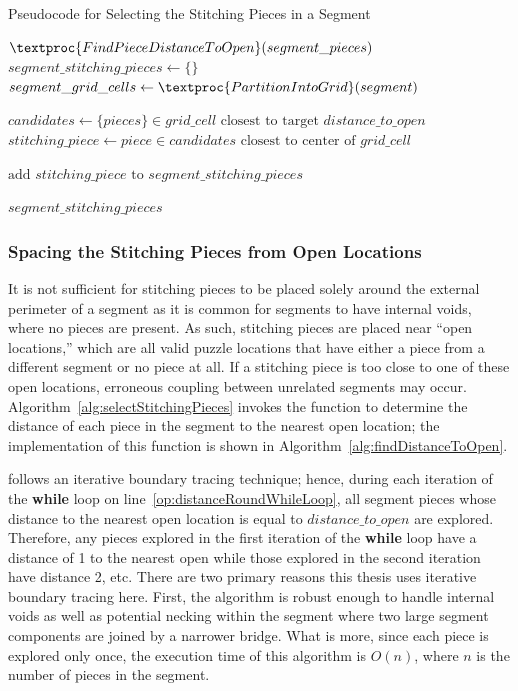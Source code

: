 \begin{algorithm}[tb]
\caption{Pseudocode for Selecting the Stitching Pieces in a Segment}
\label{alg:selectStitchingPieces}
\begin{algorithmic}[1]
	\State $\textproc{FindPieceDistanceToOpen}(segment\_pieces)$
	\State $segment\_stitching\_pieces \gets \{ \}$
    \State $segment\_grid\_cells \gets \textproc{PartitionIntoGrid}(segment)$
\item []
			\State $candidates \gets \{pieces \} \in grid\_cell \text{ closest to target } distance\_to\_open$
			\State $stitching\_piece \gets piece \in candidates \text{ closest to center of } grid\_cell$
\item []
			\State $\text{add } stitching\_piece \text{ to } segment\_stitching\_pieces$
		\EndIf
	\EndFor
\item []
	\State \Return $segment\_stitching\_pieces$
\EndProcedure
\end{algorithmic}
\end{algorithm}


\subsubsection{Spacing the Stitching Pieces from Open Locations}\label{sec:determiningSpacingToNearestOpenLocation}

It is not sufficient for stitching pieces to be placed solely around the external perimeter of a segment as it is common for segments to have internal voids, where no pieces are present.  As such, stitching pieces are placed near ``open locations,'' which are all valid puzzle locations that have either a piece from a different segment or no piece at all. If a stitching piece is too close to one of these open locations, erroneous coupling between unrelated segments may occur.  Algorithm~\ref{alg:selectStitchingPieces} invokes the function  to determine the distance of each piece in the segment to the nearest open location; the implementation of this function is shown in Algorithm~\ref{alg:findDistanceToOpen}.  

 follows an iterative boundary tracing technique; hence, during each iteration of the \textbf{while} loop on line~\ref{op:distanceRoundWhileLoop}, all segment pieces whose distance to the nearest open location is equal to $distance\_to\_open$ are explored.  Therefore, any pieces explored in the first iteration of the \textbf{while} loop have a distance of 1 to the nearest open while those explored in the second iteration have distance 2, etc. There are two primary reasons this thesis uses iterative boundary tracing here.  First, the algorithm is robust enough to handle internal voids as well as potential necking within the segment where two large segment components are joined by a narrower bridge. What is more, since each piece is explored only once, the execution time of this algorithm is $O(n)$, where $n$ is the number of pieces in the segment.

